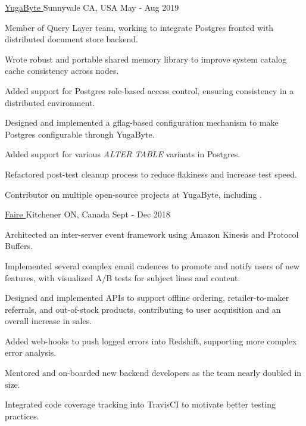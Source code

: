 
\begin{cventries}

  {\href{https://www.yugabyte.com}{YugaByte \faExternalLink}} {Sunnyvale CA,
    USA} {May - Aug 2019} {
    \begin{cvitems}
    \item Member of Query Layer team, working to integrate Postgres fronted with
      distributed document store backend.
    \item Wrote robust and portable shared memory library to improve system
      catalog cache consistency across nodes.
    \item Added support for Postgres role-based access control, ensuring
      consistency in a distributed environment.
    \item Designed and implemented a gflag-based configuration mechanism to make
      Postgres configurable through YugaByte.
    \item Added support for various \textit{ALTER TABLE} variants in Postgres.
    \item Refactored post-test cleanup process to reduce flakiness and increase
      test speed.
    \item Contributor on multiple open-source projects at YugaByte, including
      \thinspace
      \href{https://github.com/YugaByte/yugabyte-db/commits?author=srhickma}{\color[HTML]{3090C7}{yugabyte-db
          \faExternalLink}}.
    \end{cvitems}
  }

  {\href{https://www.faire.com}{Faire \faExternalLink}} {Kitchener ON, Canada}
  {Sept - Dec 2018} {
    \begin{cvitems}
    \item Architected an inter-server event framework using Amazon Kinesis and
      Protocol Buffers.
    \item Implemented several complex email cadences to promote and notify users
      of new features, with visualized A/B tests for subject lines and content.
    \item Designed and implemented APIs to support offline ordering,
      retailer-to-maker referrals, and out-of-stock products, contributing to
      user acquisition and an overall increase in sales.
    \item Added web-hooks to push logged errors into Redshift, supporting more
      complex error analysis.
    \item Mentored and on-boarded new backend developers as the team nearly
      doubled in size.
    \item Integrated code coverage tracking into TravisCI to motivate better
      testing practices.
    \end{cvitems}
  }
    

\end{cventries}
